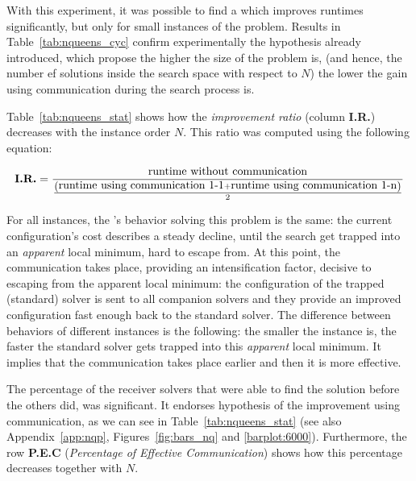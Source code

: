 With this experiment, it was possible to find a \commstr{} which improves runtimes significantly, but only for small instances of the problem. %
Results in Table~\ref{tab:nqueens_cyc} confirm experimentally the hypothesis already introduced, which propose the higher the size of the problem is, (and hence, the number ef solutions inside the search space with respect to $N$) the lower the gain using communication during the search process is.

Table~\ref{tab:nqueens_stat} shows how the \textit{improvement ratio} (column \textbf{I.R.}) decreases with the instance order $N$. This ratio was computed using the following equation:

\[
\text{\bf I.R.}=\frac{\mbox{runtime without communication}}{\frac{\left(\mbox{runtime using communication 1-1} + \mbox{runtime using communication 1-n}\right)}{2}}
\] 

For all instances, the \posl's behavior solving this problem is the same: the current configuration's cost describes a steady decline, until the search get trapped into an \textit{apparent} local minimum, hard to escape from. At this point, the communication takes place, providing an intensification factor, decisive to escaping from the apparent local minimum: the configuration of the trapped (standard) solver is sent to all companion solvers and they provide an improved configuration fast enough back to the standard solver. The difference between behaviors of different instances is the following: the smaller the instance is, the faster the standard solver gets trapped into this \textit{apparent} local minimum. It implies that the communication takes place earlier and then it is more effective.

The percentage of the receiver solvers that were able to find the solution before the others did, was significant. It endorses hypothesis of the improvement using communication, as we can see in Table~\ref{tab:nqueens_stat} (see also Appendix~\ref{app:nqp}, Figures~\ref{fig:bars_nq} and \ref{barplot:6000}). Furthermore, the row \textbf{P.E.C} (\textit{Percentage of Effective Communication}) shows how this percentage decreases together with $N$.


